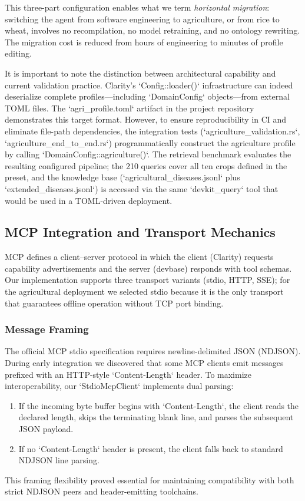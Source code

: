 This three-part configuration enables what we term \textit{horizontal migration}: switching the agent from software engineering to agriculture, or from rice to wheat, involves no recompilation, no model retraining, and no ontology rewriting. The migration cost is reduced from hours of engineering to minutes of profile editing.

It is important to note the distinction between architectural capability and current validation practice. Clarity's `Config::loader()` infrastructure can indeed deserialize complete profiles---including `DomainConfig` objects---from external TOML files. The `agri\_profile.toml` artifact in the project repository demonstrates this target format. However, to ensure reproducibility in CI and eliminate file-path dependencies, the integration tests (`agriculture\_validation.rs`, `agriculture\_end\_to\_end.rs`) programmatically construct the agriculture profile by calling `DomainConfig::agriculture()`. The retrieval benchmark evaluates the resulting configured pipeline; the 210 queries cover all ten crops defined in the preset, and the knowledge base (`agricultural\_diseases.jsonl` plus `extended\_diseases.jsonl`) is accessed via the same `devkit\_query` tool that would be used in a TOML-driven deployment.

\subsection{MCP Integration and Transport Mechanics}

MCP defines a client--server protocol in which the client (Clarity) requests capability advertisements and the server (devbase) responds with tool schemas. Our implementation supports three transport variants (stdio, HTTP, SSE); for the agricultural deployment we selected stdio because it is the only transport that guarantees offline operation without TCP port binding.

\subsubsection{Message Framing}

The official MCP stdio specification requires newline-delimited JSON (NDJSON). During early integration we discovered that some MCP clients emit messages prefixed with an HTTP-style `Content-Length` header. To maximize interoperability, our `StdioMcpClient` implements dual parsing:
\begin{enumerate}[leftmargin=*]
    \item If the incoming byte buffer begins with `Content-Length`, the client reads the declared length, skips the terminating blank line, and parses the subsequent JSON payload.
    \item If no `Content-Length` header is present, the client falls back to standard NDJSON line parsing.
\end{enumerate}
This framing flexibility proved essential for maintaining compatibility with both strict NDJSON peers and header-emitting toolchains.

